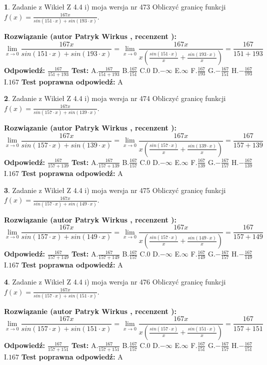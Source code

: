 \documentclass[12pt, a4paper]{article}
\theoremstyle{definition} %
\newtheorem{zad}{}
\newcommand{\zadStart}[1]{\begin{zad}#1\newline}
\newcommand{\zadStop}{\end{zad}}
\newcommand{\rozwStart}[2]{\noindent \textbf{Rozwiązanie (autor #1 , recenzent #2): }\newline}
\newcommand{\rozwStop}{\newline}
\newcommand{\odpStart}{\noindent \textbf{Odpowiedź:}\newline}
\newcommand{\odpStop}{\newline}
\newcommand{\testStart}{\noindent \textbf{Test:}\newline}
\newcommand{\testStop}{\newline}
\newcommand{\kluczStart}{\noindent \textbf{Test poprawna odpowiedź:}\newline}
\newcommand{\kluczStop}{\newline}
\begin{document}
\zadStart{Zadanie z Wikieł Z 4.4 i) moja wersja nr 473}
Obliczyć granicę funkcji $f(x)=\frac{167x}{sin(151\cdot x) +sin(193\cdot x)}$.
\zadStop
\rozwStart{Patryk Wirkus}{}
$$\lim\limits_{x\to 0}\frac{167x}{sin(151\cdot x) +sin(193\cdot x)}=\lim\limits_{x\to 0}\frac{167x}{x(\frac{sin(151\cdot x)}{x}+\frac{sin(193\cdot x)}{x})}=\frac{167}{151+193}$$
\rozwStop
\odpStart
$\frac{167}{151+193}$
\odpStop
\testStart
A.$\frac{167}{151+193}$
B.$\frac{167}{151}$
C.$0$
D.$-\infty$
E.$\infty$
F.$\frac{167}{193}$
G.$-\frac{167}{151}$
H.$-\frac{167}{193}$
I.$167$
\testStop
\kluczStart
A
\kluczStop



\zadStart{Zadanie z Wikieł Z 4.4 i) moja wersja nr 474}
Obliczyć granicę funkcji $f(x)=\frac{167x}{sin(157\cdot x) +sin(139\cdot x)}$.
\zadStop
\rozwStart{Patryk Wirkus}{}
$$\lim\limits_{x\to 0}\frac{167x}{sin(157\cdot x) +sin(139\cdot x)}=\lim\limits_{x\to 0}\frac{167x}{x(\frac{sin(157\cdot x)}{x}+\frac{sin(139\cdot x)}{x})}=\frac{167}{157+139}$$
\rozwStop
\odpStart
$\frac{167}{157+139}$
\odpStop
\testStart
A.$\frac{167}{157+139}$
B.$\frac{167}{157}$
C.$0$
D.$-\infty$
E.$\infty$
F.$\frac{167}{139}$
G.$-\frac{167}{157}$
H.$-\frac{167}{139}$
I.$167$
\testStop
\kluczStart
A
\kluczStop



\zadStart{Zadanie z Wikieł Z 4.4 i) moja wersja nr 475}
Obliczyć granicę funkcji $f(x)=\frac{167x}{sin(157\cdot x) +sin(149\cdot x)}$.
\zadStop
\rozwStart{Patryk Wirkus}{}
$$\lim\limits_{x\to 0}\frac{167x}{sin(157\cdot x) +sin(149\cdot x)}=\lim\limits_{x\to 0}\frac{167x}{x(\frac{sin(157\cdot x)}{x}+\frac{sin(149\cdot x)}{x})}=\frac{167}{157+149}$$
\rozwStop
\odpStart
$\frac{167}{157+149}$
\odpStop
\testStart
A.$\frac{167}{157+149}$
B.$\frac{167}{157}$
C.$0$
D.$-\infty$
E.$\infty$
F.$\frac{167}{149}$
G.$-\frac{167}{157}$
H.$-\frac{167}{149}$
I.$167$
\testStop
\kluczStart
A
\kluczStop



\zadStart{Zadanie z Wikieł Z 4.4 i) moja wersja nr 476}
Obliczyć granicę funkcji $f(x)=\frac{167x}{sin(157\cdot x) +sin(151\cdot x)}$.
\zadStop
\rozwStart{Patryk Wirkus}{}
$$\lim\limits_{x\to 0}\frac{167x}{sin(157\cdot x) +sin(151\cdot x)}=\lim\limits_{x\to 0}\frac{167x}{x(\frac{sin(157\cdot x)}{x}+\frac{sin(151\cdot x)}{x})}=\frac{167}{157+151}$$
\rozwStop
\odpStart
$\frac{167}{157+151}$
\odpStop
\testStart
A.$\frac{167}{157+151}$
B.$\frac{167}{157}$
C.$0$
D.$-\infty$
E.$\infty$
F.$\frac{167}{151}$
G.$-\frac{167}{157}$
H.$-\frac{167}{151}$
I.$167$
\testStop
\kluczStart
A
\kluczStop
\end{document}

